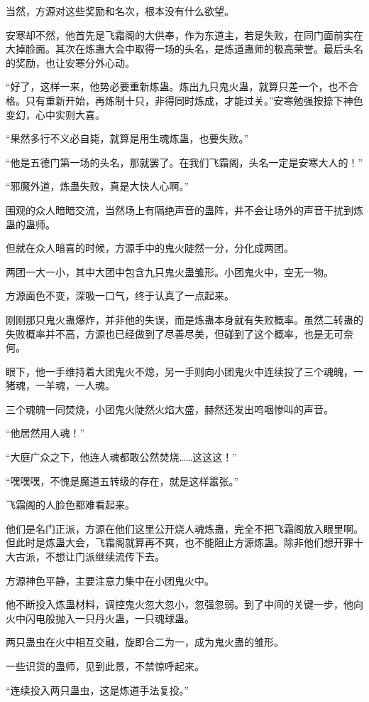 \begin{this_body}
当然，方源对这些奖励和名次，根本没有什么欲望。

安寒却不然，他首先是飞霜阁的大供奉，作为东道主，若是失败，在同门面前实在大掉脸面。其次在炼蛊大会中取得一场的头名，是炼道蛊师的极高荣誉。最后头名的奖励，也让安寒分外心动。

“好了，这样一来，他势必要重新炼蛊。炼出九只鬼火蛊，就算只差一个，也不合格。只有重新开始，再炼制十只，非得同时炼成，才能过关。”安寒勉强按捺下神色变幻，心中实则大喜。

“果然多行不义必自毙，就算是用生魂炼蛊，也要失败。”

“他是五德门第一场的头名，那就罢了。在我们飞霜阁，头名一定是安寒大人的！”

“邪魔外道，炼蛊失败，真是大快人心啊。”

围观的众人暗暗交流，当然场上有隔绝声音的蛊阵，并不会让场外的声音干扰到炼蛊的蛊师。

但就在众人暗喜的时候，方源手中的鬼火陡然一分，分化成两团。

两团一大一小，其中大团中包含九只鬼火蛊雏形。小团鬼火中，空无一物。

方源面色不变，深吸一口气，终于认真了一点起来。

刚刚那只鬼火蛊爆炸，并非他的失误，而是炼蛊本身就有失败概率。虽然二转蛊的失败概率并不高，方源也已经做到了尽善尽美，但碰到了这个概率，也是无可奈何。

眼下，他一手维持着大团鬼火不熄，另一手则向小团鬼火中连续投了三个魂魄，一猪魂，一羊魂，一人魂。

三个魂魄一同焚烧，小团鬼火陡然火焰大盛，赫然还发出呜咽惨叫的声音。

“他居然用人魂！”

“大庭广众之下，他连人魂都敢公然焚烧……这这这！”

“嘿嘿嘿，不愧是魔道五转级的存在，就是这样嚣张。”

飞霜阁的人脸色都难看起来。

他们是名门正派，方源在他们这里公开烧人魂炼蛊，完全不把飞霜阁放入眼里啊。但此时是炼蛊大会，飞霜阁就算再不爽，也不能阻止方源炼蛊。除非他们想开罪十大古派，不想让门派继续流传下去。

方源神色平静，主要注意力集中在小团鬼火中。

他不断投入炼蛊材料，调控鬼火忽大忽小，忽强忽弱。到了中间的关键一步，他向火中闪电般抛入一只丹火蛊，一只魂球蛊。

两只蛊虫在火中相互交融，旋即合二为一，成为鬼火蛊的雏形。

一些识货的蛊师，见到此景，不禁惊呼起来。

“连续投入两只蛊虫，这是炼道手法复投。”


\end{this_body}
